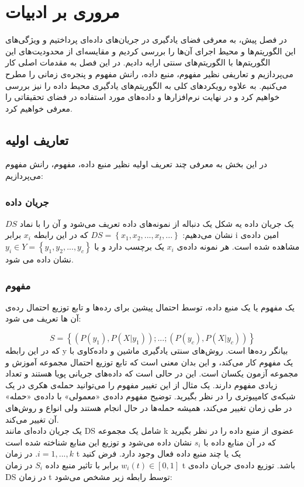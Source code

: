 
\chapter{مروری بر ادبیات}
\thispagestyle{empty}

در فصل پیش، به معرفی فضای یادگیری در جریان‌های داده‌ای پرداختیم  و ویژگی‌های این الگوریتم‌ها و محیط اجرای آن‌ها  را بررسی کردیم و مقایسه‌ای از محدودیت‌های این الگوریتم‌ها با الگوریتم‌های سنتی ارایه دادیم. در این فصل به مقدمات اصلی کار می‌پردازیم و تعاریفی نظیر مفهوم، منبع داده، رانش مفهوم و پنجره‌ی زمانی را مطرح می‌کنیم. به علاوه رویکردهای کلی به الگوریتم‌های یادگیری محیط داده را نیز بررسی خواهیم کرد و در نهایت نرم‌افزارها و داده‌های مورد استفاده در فضای تحقیقاتی را معرفی خواهیم کرد.  

\section{تعاریف اولیه}\label{sec2}
در این بخش به معرفی چند تعریف اولیه نظیر منبع داده، مفهوم، رانش مفهوم می‌پردازیم:
\subsection{جریان داده}
یک جریان داده  یه شکل یک دنباله از نمونه‌های داده تعریف می‌شود و آن را با نماد $DS$ نشان می‌دهیم:
$DS = \left\{ x_1, x_2, ..., x_t, ...\right\}$
که در این رابطه $x_i$ برابر i امین داده‌ی مشاهده شده است. هر نمونه داده‌ی $x_i$ یک برچسب دارد و با  $ y_i \in Y = \left\{y_1, y_2, ..., y_c\right\} $ نشان داده می شود.


\subsection{مفهوم}
یک مفهوم یا یک منبع داده، توسط احتمال پیشین برای رده‌ها و تابع توزیع احتمال رده‌‌ی آن ها تعریف می شود:

\begin{equation}
S = \left\{(P(y_1), P(X|y_1));...;(P(y_c), P(X|y_c))\right\} 
\end{equation}
که در این رابطه y بیانگر رده‌ها است. روش‌های سنتی یادگیری ماشین و داده‌کاوی با یک مفهوم کار می‌کند، و این بدان معنی است که تابع توزیع احتمال مجموعه آموزش و مجموعه آزمون یکسان است. این در حالی است که داده‌های جریانی پویا هستند و تعداد زیادی مفهوم دارند. یک مثال از این تغییر مفهوم را می‌توانید حمله‌ی هکری در یک شبکه‌ی کامپیوتری را در نظر بگیرید. توضیح مفهوم داده‌ی «معمولی» با داده‌ی «حمله» در طی زمان تغییر می‌کند، همیشه حمله‌ها در حال انجام هستند ولی انواع و روش‌های آن تغییر می‌کند.
\\
یک جریان داده‌ای مانند DS شامل یک مجموعه k عضوی از منبع داده را در نظر بگیرید که در آن منابع داده با $s_i$ نشان‌ داده می‌شود و توزیع این منابع شناخته شده است $ i = 1, ..., k $. در زمان t یک یا چند منبع داده فعال وجود دارد. فرض کنید $w_i(t) \in [0, 1]$ برابر با تاثیر منبع داده  $S_i$ در زمان t باشد. توزیع داده‌ی جریان داده‌ی DS در زمان t توسط رابطه زیر مشخص می‌شود:

